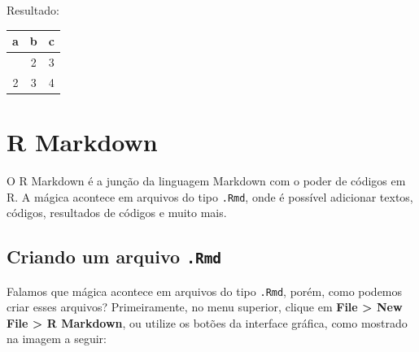 \documentclass[
]{book}
\begin{document}
Resultado:

\begin{longtable}[]{@{}ccc@{}}
\toprule\noalign{}
a & b & c \\
\midrule\noalign{}
\endhead
\bottomrule\noalign{}
\endlastfoot
1 & 2 & 3 \\
2 & 3 & 4 \\
\end{longtable}

\section{R Markdown}\label{r-markdown}

O R Markdown é a junção da linguagem Markdown com o poder de códigos em R. A mágica acontece em arquivos do tipo \texttt{.Rmd}, onde é possível adicionar textos, códigos, resultados de códigos e muito mais.

\subsection{\texorpdfstring{Criando um arquivo \texttt{.Rmd}}{Criando um arquivo .Rmd}}\label{criando-um-arquivo-.rmd}

Falamos que mágica acontece em arquivos do tipo \texttt{.Rmd}, porém, como podemos criar esses arquivos? Primeiramente, no menu superior, clique em \textbf{File \textgreater{} New File \textgreater{} R Markdown}, ou utilize os botões da interface gráfica, como mostrado na imagem a seguir:
\end{document}
